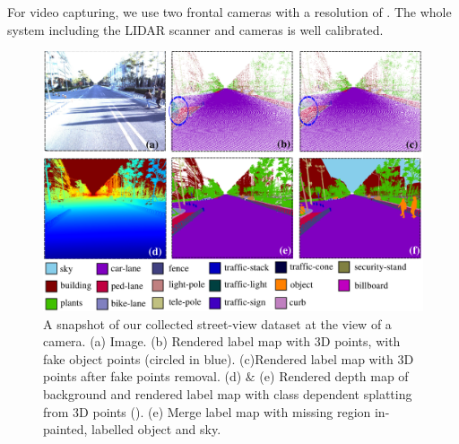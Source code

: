 For video capturing, we use two frontal cameras with a resolution of . The whole system including the LIDAR scanner and cameras is well calibrated.

\begin{figure}[!htpb]
\begin{center}
\includegraphics[width=\linewidth]{fig/dataset.pdf}
\end{center}
   \caption{A snapshot of our collected street-view dataset at the view of a camera. (a) Image. (b) Rendered label map with 3D points, with fake object points (circled in blue). (c)Rendered label map with 3D points after fake points removal. (d) $\&$ (e) Rendered depth map of background and rendered label map with class dependent splatting from 3D points (). (e) Merge label map with missing region in-painted, labelled object and sky.}
\label{fig:data}
\end{figure}

